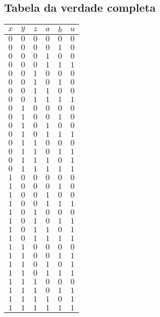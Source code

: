 \documentclass [15pt,a4paper,twoside]{article}
\begin{document}
\subsection{Tabela da verdade completa}
\begin{center}
\begin{tabular}{ccccc|c}
$x$&$y$&$z$&$a$&$b$&$u$\\
\hline
$0$&$0$&$0$&$0$&$0$&$0$\\
$0$&$0$&$0$&$0$&$1$&$0$\\
$0$&$0$&$0$&$1$&$0$&$0$\\
$0$&$0$&$0$&$1$&$1$&$1$\\
$0$&$0$&$1$&$0$&$0$&$0$\\
$0$&$0$&$1$&$0$&$1$&$0$\\
$0$&$0$&$1$&$1$&$0$&$0$\\
$0$&$0$&$1$&$1$&$1$&$1$\\
$0$&$1$&$0$&$0$&$0$&$0$\\
$0$&$1$&$0$&$0$&$1$&$0$\\
$0$&$1$&$0$&$1$&$0$&$0$\\
$0$&$1$&$0$&$1$&$1$&$1$\\
$0$&$1$&$1$&$0$&$0$&$0$\\
$0$&$1$&$1$&$0$&$1$&$1$\\
$0$&$1$&$1$&$1$&$0$&$1$\\
$0$&$1$&$1$&$1$&$1$&$1$\\
$1$&$0$&$0$&$0$&$0$&$0$\\
$1$&$0$&$0$&$0$&$1$&$0$\\
$1$&$0$&$0$&$1$&$0$&$0$\\
$1$&$0$&$0$&$1$&$1$&$1$\\
$1$&$0$&$1$&$0$&$0$&$0$\\
$1$&$0$&$1$&$0$&$1$&$1$\\
$1$&$0$&$1$&$1$&$0$&$1$\\
$1$&$0$&$1$&$1$&$1$&$1$\\
$1$&$1$&$0$&$0$&$0$&$0$\\
$1$&$1$&$0$&$0$&$1$&$1$\\
$1$&$1$&$0$&$1$&$0$&$1$\\
$1$&$1$&$0$&$1$&$1$&$1$\\
$1$&$1$&$1$&$0$&$0$&$0$\\
$1$&$1$&$1$&$0$&$1$&$1$\\
$1$&$1$&$1$&$1$&$0$&$1$\\
$1$&$1$&$1$&$1$&$1$&$1$\\

\end{tabular}
\end{center}
\end{document}
